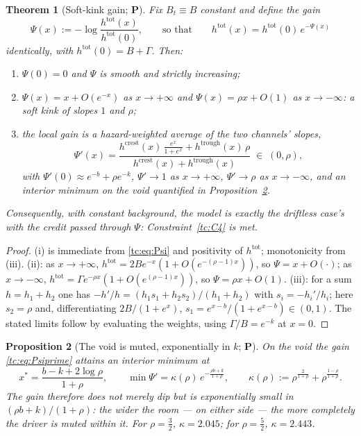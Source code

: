 \documentclass[11pt]{article}
\numberwithin{equation}{section}
\theoremstyle{plain}
\newtheorem{theorem}{Theorem}[section]
\newtheorem{proposition}[theorem]{Proposition}
\theoremstyle{definition}
\theoremstyle{remark}
\begin{document}
\begin{theorem}[Soft-kink gain; \textbf{P}]\label{tc:thm:gain}
Fix $B_t\equiv B$ constant and define the \emph{gain}
\begin{equation}\label{tc:eq:Psi}
\Psi(x):=-\log\frac{h^{\mathrm{tot}}(x)}{h^{\mathrm{tot}}(0)},
\qquad\text{so that}\qquad
h^{\mathrm{tot}}(x)=h^{\mathrm{tot}}(0)\,e^{-\Psi(x)}
\end{equation}
identically, with $h^{\mathrm{tot}}(0)=B+\Gamma$. Then:
\begin{enumerate}[label=\emph{(\roman*)},itemsep=1pt]
\item $\Psi(0)=0$ and $\Psi$ is smooth and strictly increasing;
\item $\Psi(x)=x+O(e^{-x})$ as $x\to+\infty$ and
$\Psi(x)=\rho x+O(1)$ as $x\to-\infty$: a \emph{soft kink} of slopes
$1$ and $\rho$;
\item the local gain is a hazard-weighted average of the two channels'
slopes,
\begin{equation}\label{tc:eq:Psiprime}
\Psi'(x)=\frac{h^{\mathrm{crest}}(x)\,\frac{e^{x}}{1+e^{x}}
+h^{\mathrm{trough}}(x)\,\rho}
{h^{\mathrm{crest}}(x)+h^{\mathrm{trough}}(x)}\;\in\;(0,\rho),
\end{equation}
with $\Psi'(0)\approx e^{-b}+\rho e^{-k}$, $\Psi'\to1$ as
$x\to+\infty$, $\Psi'\to\rho$ as $x\to-\infty$, and an interior minimum
on the void quantified in Proposition~\ref{tc:prop:mingain}.
\end{enumerate}
Consequently, with constant background, the model is exactly the driftless case's with the credit passed through $\Psi$: Constraint~\ref{tc:C4} is
met.
\end{theorem}

\begin{proof}
(i) is immediate from \eqref{tc:eq:Psi} and positivity of
$h^{\mathrm{tot}}$; monotonicity from (iii). (ii): as $x\to+\infty$,
$h^{\mathrm{tot}}=2Be^{-x}(1+O(e^{-(\rho-1)x}))$, so $\Psi=x+O(\cdot)$;
as $x\to-\infty$, $h^{\mathrm{tot}}=\Gamma e^{-\rho x}(1+O(e^{(\rho-1)
x}))$, so $\Psi=\rho x+O(1)$. (iii): for a sum $h=h_1+h_2$ one has
$-h'/h=(h_1s_1+h_2s_2)/(h_1+h_2)$ with $s_i=-h_i'/h_i$; here
$s_2=\rho$ and, differentiating $2B/(1+e^{x})$,
$s_1=e^{x-b}/(1+e^{x-b})\in(0,1)$. The stated limits follow by
evaluating the weights, using $\Gamma/B=e^{-k}$ at $x=0$.
\end{proof}

\begin{proposition}[The void is muted, exponentially in $k$;
\textbf{P}]\label{tc:prop:mingain}
On the void the gain \eqref{tc:eq:Psiprime} attains an interior minimum
at
\begin{equation}\label{tc:eq:xstar}
x^{*}=\frac{b-k+2\log\rho}{1+\rho},
\qquad
\min\Psi'=\kappa(\rho)\,e^{-\frac{\rho b+k}{1+\rho}},
\qquad
\kappa(\rho):=\rho^{\frac{2}{1+\rho}}+\rho^{\frac{1-\rho}{1+\rho}} .
\end{equation}
The gain therefore does not merely dip but is \emph{exponentially small
in $(\rho b+k)/(1+\rho)$}: the wider the room --- on either side --- the
more completely the driver is muted within it. For $\rho=\tfrac32$,
$\kappa=2.045$; for $\rho=\tfrac52$, $\kappa=2.443$.
\end{proposition}
\end{document}
